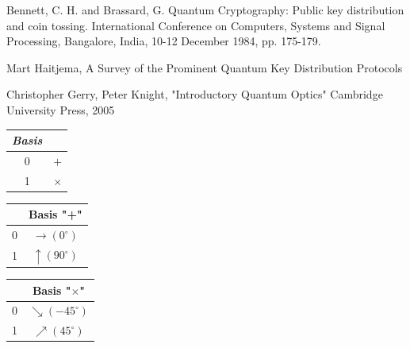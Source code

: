 \begin{thebibliography}{2}
Bennett, C. H. and Brassard,
G. Quantum Cryptography: Public key distribution and coin tossing.
International Conference on Computers, Systems and Signal Processing, Bangalore, India, 10-12 December 1984, pp. 175-179.

Mart Haitjema, A Survey of the Prominent Quantum Key Distribution Protocols

Christopher Gerry, Peter Knight, "Introductory Quantum Optics" Cambridge University Press, 2005

\end{thebibliography}
\cleardoublepage

\begin{table}[H]
\centering
\begin{tabular}{c|c}
\textbf{\textit{Basis}}         &  \\ \hline
 0 & $+$ \\
 1 & $\times$ \\
\end{tabular}
\end{table}


\begin{table}[H]
\centering
\begin{tabular}{c|c}
            & Basis "+" \\ \hline
 0 & $\to (0^{\circ})$ \\
 1 & $\uparrow (90^{\circ})$ \\
\end{tabular}
\end{table}


\begin{table}[H]
\centering
\begin{tabular}{c|c}
      & Basis "$\times$" \\ \hline
 0 & $\searrow (-45^{\circ})$ \\
 1 & $\nearrow (45^{\circ})$ \\
\end{tabular}
\end{table}


